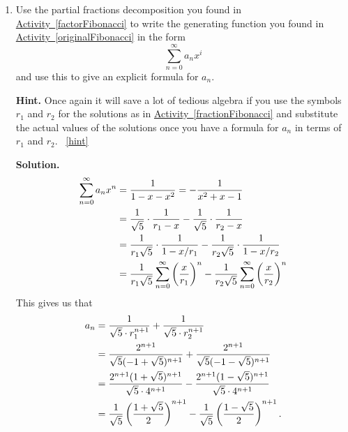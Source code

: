 \documentclass{book}
\begin{document}
\setcounter{project}{269}
\addtocounter{project}{-1}
\begin{activity}[]\label{solveFibonacci}
\leavevmode%
\begin{enumerate}[font=\bfseries,label=(\alph*),ref=\alph*]
\item\label{task-250} \hypertarget{p-1398}{}%
Use the partial fractions decomposition you found in \hyperref[factorFibonacci]{Activity~\ref{factorFibonacci}} to write the generating function you found in \hyperref[originalFibonacci]{Activity~\ref{originalFibonacci}} in the form%
\begin{equation*}
\sum_{n=0}^\infty a_nx^i
\end{equation*}
and use this to give an explicit formula for \(a_n\).%
\par\smallskip%
\noindent\textbf{Hint.}\hypertarget{hint-172}{}\quad%
\hypertarget{p-1399}{}%
Once again it will save a lot of tedious algebra if you use the symbols \(r_1\) and \(r_2\) for the solutions as in \hyperref[fractionFibonacci]{Activity~\ref{fractionFibonacci}} and substitute the actual values of the solutions once you have a formula for \(a_n\) in terms of \(r_1\) and \(r_2\).%
~\hfill{\tiny\hyperlink{a-269.a}{[hint]}\hypertarget{q-269.a}{}}\par\smallskip%
\noindent\textbf{Solution.}\hypertarget{solution-181}{}\quad%
\hypertarget{p-1400}{}%
%
\begin{align*}
\sum_{n=0}^\infty a_nx^n  &= \frac{1}{1-x-x^2}= -\frac{1}{x^2+x-1}\\
&= \frac{1}{\sqrt{5}}\cdot\frac{1}{r_1-x} -\frac{1}{\sqrt{5}}\cdot\frac{1}{r_2-x}\\
&= \frac{1}{r_1\sqrt{5}}\cdot\frac{1}{1-x/r_1} -\frac{1}{r_2\sqrt{5}}\cdot\frac{1}{1-x/r_2}\\
&= \frac{1}{r_1\sqrt{5}}\sum_{n=0}^\infty\left(\frac{x}{r_1}\right)^n
-\frac{1}{r_2\sqrt{5}}\sum_{n=0}^\infty  \left(\frac{x}{r_2}\right)^n
\end{align*}
This gives us that%
\begin{align*}
a_n \amp= \frac{1}{\sqrt{5}\cdot r_1^{n+1}}
+\frac{1}{\sqrt{5}\cdot r_2^{n+1}}\\
\amp= \frac{2^{n+1}}{\sqrt{5}(-1+\sqrt{5})^{n+1}}
+
\frac{2^{n+1}}{\sqrt{5}(-1-\sqrt{5})^{n+1}}\\
\amp= \frac{2^{n+1}(1+\sqrt{5})^{n+1}}{\sqrt{5}\cdot
4^{n+1}}-
\frac{2^{n+1}(1-\sqrt{5})^{n+1}}{\sqrt{5}\cdot4^{n+1}}\\
\amp= \frac{1}{\sqrt{5}}\left(\frac{1+\sqrt{5}}{2}\right)^{n+1}-
\frac{1}{\sqrt{5}}\left(\frac{1-\sqrt{5}}{2}\right)^{n+1}.

\end{align*}
\end{enumerate}
\end{activity}
\end{document}
